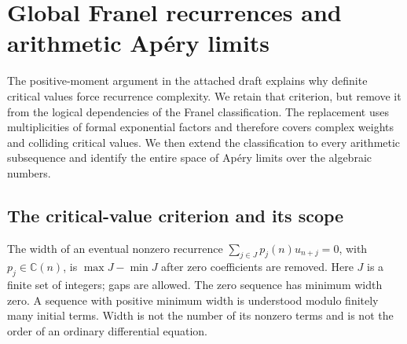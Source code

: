 \documentclass[11pt,a4paper]{article}
\theoremstyle{definition}
\theoremstyle{remark}
\numberwithin{equation}{section}
\begin{document}
\clearpage

\section{Global Franel recurrences and arithmetic Ap\'ery limits}
\label{p8:ac:section}

The positive-moment argument in the attached draft explains why definite
critical values force recurrence complexity. We retain that criterion,
but remove it from the logical dependencies of the Franel classification.
The replacement uses multiplicities of formal exponential factors and
therefore covers complex weights and colliding critical values. We then
extend the classification to every arithmetic subsequence and identify
the entire space of Ap\'ery limits over the algebraic numbers.

\subsection{The critical-value criterion and its scope}

The width of an eventual nonzero recurrence
$\sum_{j\in J}p_j(n)u_{n+j}=0$, with $p_j\in\mathbb C(n)$, is
$\max J-\min J$ after zero coefficients are removed. Here $J$ is a
finite set of integers; gaps are allowed. The zero sequence has minimum
width zero. A sequence with positive minimum width is understood modulo
finitely many initial terms. Width is not the number of its nonzero
terms and is not the order of an ordinary differential equation.
\end{document}
